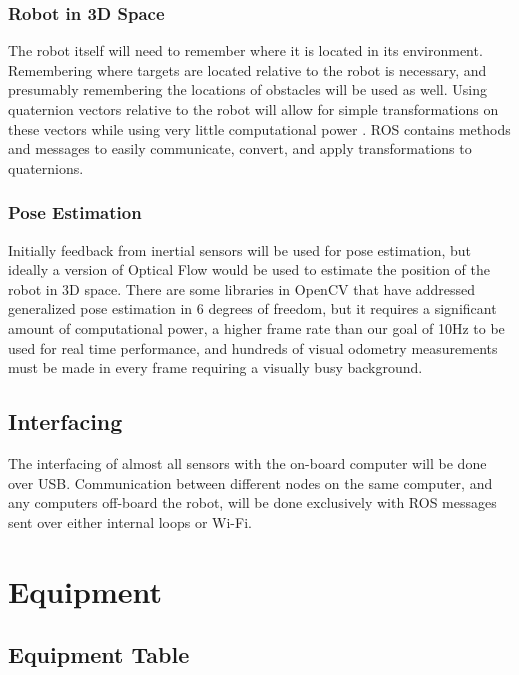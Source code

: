 \documentclass{article}
\begin{document}
		\subsubsection{Robot in 3D Space}
		
		The robot itself will need to remember where it is located in its environment. Remembering where targets are located relative to the robot is necessary, and presumably remembering the locations of obstacles will be used as well. Using quaternion vectors relative to the robot will allow for simple transformations on these vectors while using very little computational power \cite{williams2010combining}. ROS contains methods and messages to easily communicate, convert, and apply transformations to quaternions.
	
		\subsubsection{Pose Estimation}
	
		Initially feedback from inertial sensors will be used for pose estimation, but ideally a version of Optical Flow would be used to estimate the position of the robot in 3D space. There are some libraries in OpenCV that have addressed generalized pose estimation in 6 degrees of freedom, but it requires a significant amount of computational power, a higher frame rate than our goal of 10Hz to be used for real time performance, and hundreds of visual odometry measurements must be made in every frame requiring a visually busy background.

	\subsection{Interfacing}
	
	The interfacing of almost all sensors with the on-board computer will be done over USB. Communication between different nodes on the same computer, and any computers off-board the robot, will be done exclusively with ROS messages sent over either internal loops or Wi-Fi.





\section{Equipment}

	\subsection{Equipment Table}
	
\end{document}
